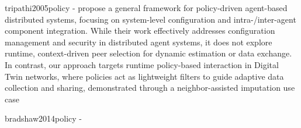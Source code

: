 






tripathi2005policy - propose a general framework for policy-driven agent-based distributed systems, focusing on system-level configuration and intra-/inter-agent component integration. While their work effectively addresses configuration management and security in distributed agent systems, it does not explore runtime, context-driven peer selection for dynamic estimation or data exchange. In contrast, our approach targets runtime policy-based interaction in Digital Twin networks, where policies act as lightweight filters to guide adaptive data collection and sharing, demonstrated through a neighbor-assisted imputation use case


bradshaw2014policy - 